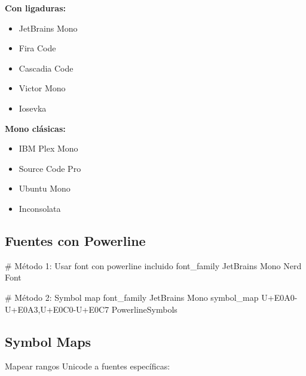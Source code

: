 \documentclass[
  doc,
  floatsintext,
  longtable,
  a4paper,
  nolmodern,
  notxfonts,
  notimes,
  12pt,
  colorlinks=true,linkcolor=blue,citecolor=blue,urlcolor=blue]{apa7}
\newenvironment{Shaded}{\begin{snugshade}}{\end{snugshade}}
\newcommand{\CommentTok}[1]{\textcolor[rgb]{0.37,0.37,0.37}{#1}}
\newcommand{\DataTypeTok}[1]{\textcolor[rgb]{0.68,0.00,0.00}{#1}}
\newcommand{\ErrorTok}[1]{\textcolor[rgb]{0.68,0.00,0.00}{#1}}
\providecommand{\tightlist}{%
  \setlength{\itemsep}{0pt}\setlength{\parskip}{0pt}}
\begin{document}
\textbf{Con ligaduras:}

\begin{itemize}
\tightlist
\item
  JetBrains Mono
\item
  Fira Code
\item
  Cascadia Code
\item
  Victor Mono
\item
  Iosevka
\end{itemize}

\textbf{Mono clásicas:}

\begin{itemize}
\tightlist
\item
  IBM Plex Mono
\item
  Source Code Pro
\item
  Ubuntu Mono
\item
  Inconsolata
\end{itemize}

\subsection{Fuentes con Powerline}\label{fuentes-con-powerline}

\begin{Shaded}
\begin{Highlighting}[]
\CommentTok{\# Método 1: Usar font con powerline incluido}
\DataTypeTok{font\_family} \DataTypeTok{JetBrains} \DataTypeTok{Mono} \DataTypeTok{Nerd} \DataTypeTok{Font}

\CommentTok{\# Método 2: Symbol map}
\DataTypeTok{font\_family} \DataTypeTok{JetBrains} \DataTypeTok{Mono}
\DataTypeTok{symbol\_map} \DataTypeTok{U}\ErrorTok{+}\DataTypeTok{E0A0{-}U}\ErrorTok{+}\DataTypeTok{E0A3}\ErrorTok{,}\DataTypeTok{U}\ErrorTok{+}\DataTypeTok{E0C0{-}U}\ErrorTok{+}\DataTypeTok{E0C7} \DataTypeTok{PowerlineSymbols}
\end{Highlighting}
\end{Shaded}

\subsection{Symbol Maps}\label{symbol-maps}

Mapear rangos Unicode a fuentes específicas:
\end{document}
